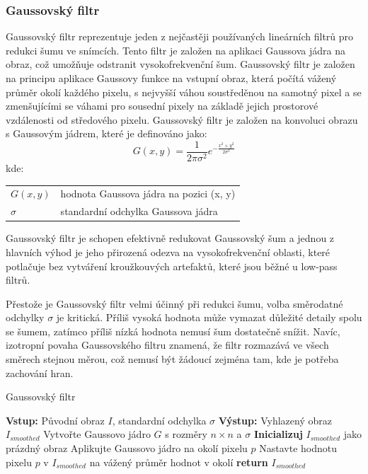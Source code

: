 \documentclass[male,czech,api_ing]{thesis}
\makeatletter
\newenvironment{conditions}[1][kde:]
    {#1 \begin{tabular}[t]{>{$}l<{$} @{${}={}$} >{\raggedright\arraybackslash}p{10cm}}}
    {\end{tabular}}
\makeatother
\begin{document}
\subsubsection{Gaussovský filtr}
Gaussovský filtr reprezentuje jeden z nejčastěji používaných lineárních filtrů pro redukci šumu ve snímcích. Tento filtr je založen na aplikaci Gaussova jádra na obraz, což umožňuje odstranit vysokofrekvenční šum. Gaussovský filtr je založen na principu aplikace Gaussovy funkce na vstupní obraz, která počítá vážený průměr okolí každého pixelu, s nejvyšší váhou soustředěnou na samotný pixel a se zmenšujícími se váhami pro sousední pixely na základě jejich prostorové vzdálenosti od středového pixelu. Gaussovský filtr je založen na konvoluci obrazu s Gaussovým jádrem, které je definováno jako:
\begin{equation}
    G(x, y) = \frac{1}{2\pi\sigma^2} e^{-\frac{x^2 + y^2}{2\sigma^2}}
\end{equation}
\begin{conditions}
    G(x, y) & hodnota Gaussova jádra na pozici (x, y) \\
    \sigma & standardní odchylka Gaussova jádra
\end{conditions}

Gaussovský filtr je schopen efektivně redukovat Gaussovský šum a jednou z hlavních výhod je jeho přirozená odezva na vysokofrekvenční oblasti, které potlačuje bez vytváření kroužkouvých artefaktů, které jsou běžné u low-pass filtrů.

Přestože je Gaussovský filtr velmi účinný při redukci šumu, volba směrodatné odchylky $\sigma$ je kritická. Příliš vysoká hodnota může vymazat důležité detaily spolu se šumem, zatímco příliš nízká hodnota nemusí šum dostatečně snížit. Navíc, izotropní povaha Gaussovského filtru znamená, že filtr rozmazává ve všech směrech stejnou měrou, což nemusí být žádoucí zejména tam, kde je potřeba zachování hran. \cite{XRayImageProcessing}

\begin{algorithm}
    \caption{Gaussovský filtr}
    \begin{algorithmic}[1]
        \State \textbf{Vstup:} Původní obraz $I$, standardní odchylka $\sigma$
        \State \textbf{Výstup:} Vyhlazený obraz $I_{smoothed}$
        \State Vytvořte Gaussovo jádro $G$ s rozměry $n \times n$ a $\sigma$
        \State \textbf{Inicializuj} $I_{smoothed}$ jako prázdný obraz
            \State Aplikujte Gaussovo jádro na okolí pixelu $p$
            \State Nastavte hodnotu pixelu $p$ v $I_{smoothed}$ na vážený průměr hodnot v okolí
        \EndFor
        \State \textbf{return} $I_{smoothed}$
    \end{algorithmic}
\end{algorithm}
\end{document}
